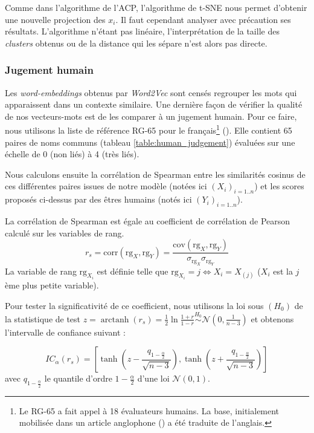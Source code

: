 \documentclass[11pt,french,french]{article}
\let\rmarkdownfootnote\footnote%
\def\footnote{\protect\rmarkdownfootnote}
\DeclareMathOperator{\arctanh}{arctanh}
\begin{document}
Comme dans l'algorithme de l'ACP, l'algorithme de t-SNE nous permet
d'obtenir une nouvelle projection des \(x_i\). Il faut cependant
analyser avec précaution ses résultats. L'algorithme n'étant pas
linéaire, l'interprétation de la taille des \emph{clusters} obtenus ou
de la distance qui les sépare n'est alors pas directe.

\subsubsection{Jugement humain}\label{sec:jugementHumain}

Les \emph{word-embeddings} obtenus par \emph{Word2Vec} sont censés
regrouper les mots qui apparaissent dans un contexte similaire. Une
dernière façon de vérifier la qualité de nos vecteurs-mots est de les
comparer à un jugement humain. Pour ce faire, nous utilisons la liste de
référence RG-65 pour le français\footnote{Le RG-65 a fait appel à 18
  évaluateurs humains. La base, initialement mobilisée dans un article
  anglophone (\cite{Rubenstein}) a été traduite de l'anglais.}
(\cite{Boumedyen}). Elle contient 65 paires de noms communs (tableau
\ref{table:human_judgement}) évaluées sur une échelle de 0 (non liés) à
4 (très liés).

Nous calculons ensuite la corrélation de Spearman entre les similarités
cosinus de ces différentes paires issues de notre modèle (notées ici
\((X_i)_{i=1..n}\)) et les scores proposés ci-dessus par des êtres
humains (notés ici \((Y_i)_{i=1..n}\)).

La corrélation de Spearman est égale au coefficient de corrélation de
Pearson calculé sur les variables de rang. \[
r_s = \mathrm{corr}(\mathrm{rg}_X, \mathrm{rg}_Y) = 
\frac{\mathrm{cov}(\mathrm{rg}_X, \mathrm{rg}_Y)}{
\sigma_{\mathrm{rg}_X} \sigma_{\mathrm{rg}_Y}
}
\] La variable de rang \(\mathrm{rg}_{X_i}\) est définie telle que
\(\mathrm{rg}_{X_i}=j \iff X_i = X_{(j)}\) (\(X_i\) est la \(j\)ème plus
petite variable).

Pour tester la significativité de ce coefficient, nous utilisons la loi
sous \((H_0)\) de la statistique de test
\(z = \arctanh(r_s) = \frac{1}{2} \ln\frac{1+r}{1-r} \overset{H_0}{\sim}\mathcal{N}(0, \frac{1}{n-3})\)
et obtenons l'intervalle de confiance suivant :

\[
IC_\alpha (r_s) = \left[\tanh\left(z-\frac{q_{1-\frac{\alpha}{2}}}{\sqrt{n-3}}\right),
\tanh\left(z+\frac{q_{1-\frac{\alpha}{2}}}{\sqrt{n-3}}\right)\right]
\] avec \(q_{1-\frac{\alpha}{2}}\) le quantile d'ordre
\(1-\frac{\alpha}{2}\) d'une loi \(\mathcal{N}(0, 1)\).
\end{document}
